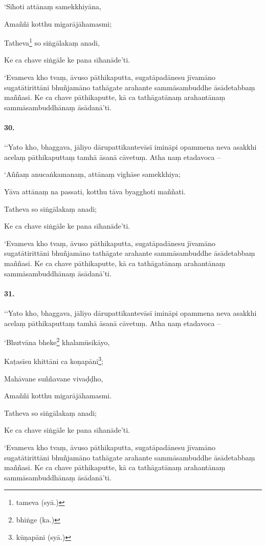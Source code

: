 ‘Sīhoti attānaṃ samekkhiyāna,

Amaññi kotthu migarājāhamasmi;

Tatheva\footnote{tameva (syā.)} so siṅgālakaṃ anadi,

Ke ca chave siṅgāle ke pana sīhanāde’ti.

‘Evameva kho tvaṃ, āvuso pāthikaputta, sugatāpadānesu jīvamāno sugatātirittāni bhuñjamāno tathāgate arahante sammāsambuddhe āsādetabbaṃ maññasi. Ke ca chave pāthikaputte, kā ca tathāgatānaṃ arahantānaṃ sammāsambuddhānaṃ āsādanā’ti.

\paragraph{30.} ‘‘Yato kho, bhaggava, jāliyo dārupattikantevāsī imināpi opammena neva asakkhi acelaṃ pāthikaputtaṃ tamhā āsanā cāvetuṃ. Atha naṃ etadavoca –

‘Aññaṃ anucaṅkamanaṃ, attānaṃ vighāse samekkhiya;

Yāva attānaṃ na passati, kotthu tāva byagghoti maññati.

Tatheva so siṅgālakaṃ anadi;

Ke ca chave siṅgāle ke pana sīhanāde’ti.

‘Evameva kho tvaṃ, āvuso pāthikaputta, sugatāpadānesu jīvamāno sugatātirittāni bhuñjamāno tathāgate arahante sammāsambuddhe āsādetabbaṃ maññasi. Ke ca chave pāthikaputte, kā ca tathāgatānaṃ arahantānaṃ sammāsambuddhānaṃ āsādanā’ti.

\paragraph{31.} ‘‘Yato kho, bhaggava, jāliyo dārupattikantevāsī imināpi opammena neva asakkhi acelaṃ pāthikaputtaṃ tamhā āsanā cāvetuṃ. Atha naṃ etadavoca –

‘Bhutvāna bheke\footnote{bhiṅge (ka.)} khalamūsikāyo,

Kaṭasīsu khittāni ca koṇapāni\footnote{kūṇapāni (syā.)};

Mahāvane suññavane vivaḍḍho,

Amaññi kotthu migarājāhamasmi.

Tatheva so siṅgālakaṃ anadi;

Ke ca chave siṅgāle ke pana sīhanāde’ti.

‘Evameva kho tvaṃ, āvuso pāthikaputta, sugatāpadānesu jīvamāno sugatātirittāni bhuñjamāno tathāgate arahante sammāsambuddhe āsādetabbaṃ maññasi. Ke ca chave pāthikaputte, kā ca tathāgatānaṃ arahantānaṃ sammāsambuddhānaṃ āsādanā’ti.

